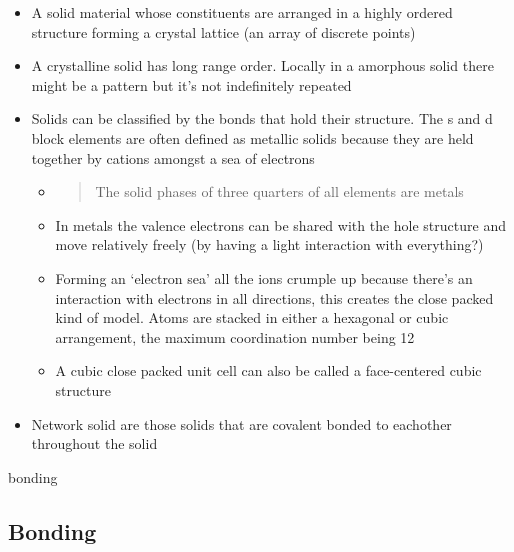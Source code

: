 \documentclass[12pt]{article}
\begin{document}
\begin{itemize}
\item
  A solid material whose constituents are arranged in a highly ordered
  structure forming a crystal lattice (an array of discrete points)
\item
  A crystalline solid has long range order. Locally in a amorphous solid
  there might be a pattern but it's not indefinitely repeated
\item
  Solids can be classified by the bonds that hold their structure. The s
  and d block elements are often defined as metallic solids because they
  are held together by cations amongst a sea of electrons

  \begin{itemize}
  \item
    \begin{quote}
    The solid phases of three quarters of all elements are metals
    \end{quote}
  \item
    In metals the valence electrons can be shared with the hole
    structure and move relatively freely (by having a light interaction
    with everything?)
  \item
    Forming an `electron sea' all the ions crumple up because there's an
    interaction with electrons in all directions, this creates the close
    packed kind of model. Atoms are stacked in either a hexagonal or
    cubic arrangement, the maximum coordination number being 12
  \item
    A cubic close packed unit cell can also be called a face-centered
    cubic structure
  \end{itemize}
\item
  Network solid are those solids that are covalent bonded to eachother
  throughout the solid
\end{itemize}

 {bonding}{%
\subsection{Bonding}\label{bonding}}
\end{document}
